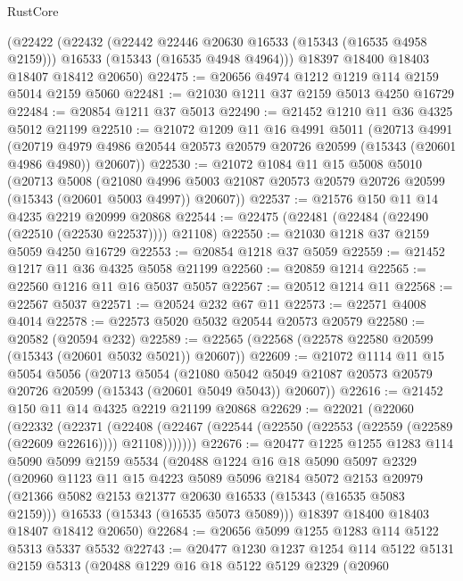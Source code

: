 \begin{lexlean}{RustCore}
\begin{coremodule}
    (@22422
      (@22432
        (@22442 @22446 @20630 @16533 (@15343 (@16535 @4958 @2159)))
        @16533
        (@15343 (@16535 @4948 @4964)))
      @18397
      @18400
      @18403
      @18407
      @18412
      @20650)
@22475 := @20656 @4974 @1212 @1219 @114 @2159 @5014 @2159 @5060
@22481 := @21030 @1211 @37 @2159 @5013 @4250 @16729
@22484 := @20854 @1211 @37 @5013
@22490 := @21452 @1210 @11 @36 @4325 @5012 @21199
@22510 := @21072
    @1209
    @11
    @16
    @4991
    @5011
    (@20713
      @4991
      (@20719 @4979 @4986 @20544 @20573 @20579 @20726 @20599 (@15343 (@20601 @4986 @4980)) @20607))
@22530 := @21072
    @1084
    @11
    @15
    @5008
    @5010
    (@20713
      @5008
      (@21080 @4996 @5003 @21087 @20573 @20579 @20726 @20599 (@15343 (@20601 @5003 @4997)) @20607))
@22537 := @21576 @150 @11 @14 @4235 @2219 @20999 @20868
@22544 := @22475 (@22481 (@22484 (@22490 (@22510 (@22530 @22537)))) @21108)
@22550 := @21030 @1218 @37 @2159 @5059 @4250 @16729
@22553 := @20854 @1218 @37 @5059
@22559 := @21452 @1217 @11 @36 @4325 @5058 @21199
@22560 := @20859 @1214
@22565 := @22560 @1216 @11 @16 @5037 @5057
@22567 := @20512 @1214 @11
@22568 := @22567 @5037
@22571 := @20524 @232 @67 @11
@22573 := @22571 @4008 @4014
@22578 := @22573 @5020 @5032 @20544 @20573 @20579
@22580 := @20582 (@20594 @232)
@22589 := @22565 (@22568 (@22578 @22580 @20599 (@15343 (@20601 @5032 @5021)) @20607))
@22609 := @21072
    @1114
    @11
    @15
    @5054
    @5056
    (@20713
      @5054
      (@21080 @5042 @5049 @21087 @20573 @20579 @20726 @20599 (@15343 (@20601 @5049 @5043)) @20607))
@22616 := @21452 @150 @11 @14 @4325 @2219 @21199 @20868
@22629 := @22021
    (@22060
      (@22332
        (@22371
          (@22408 (@22467 (@22544 (@22550 (@22553 (@22559 (@22589 (@22609 @22616)))) @21108)))))))
@22676 := @20477
    @1225
    @1255
    @1283
    @114
    @5090
    @5099
    @2159
    @5534
    (@20488
      @1224
      @16
      @18
      @5090
      @5097
      @2329
      (@20960
        @1123
        @11
        @15
        @4223
        @5089
        @5096
        @2184
        @5072
        @2153
        @20979
        (@21366 @5082 @2153 @21377 @20630 @16533 (@15343 (@16535 @5083 @2159)))
        @16533
        (@15343 (@16535 @5073 @5089)))
      @18397
      @18400
      @18403
      @18407
      @18412
      @20650)
@22684 := @20656 @5099 @1255 @1283 @114 @5122 @5313 @5337 @5532
@22743 := @20477
    @1230
    @1237
    @1254
    @114
    @5122
    @5131
    @2159
    @5313
    (@20488
      @1229
      @16
      @18
      @5122
      @5129
      @2329
      (@20960

\end{coremodule}
\end{lexlean}
